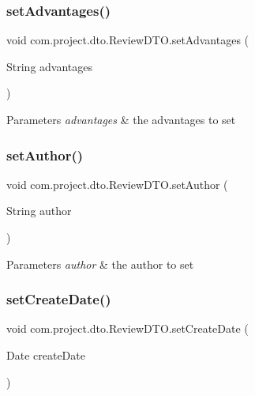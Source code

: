 \subsubsection{set\+Advantages()}
{\footnotesize\ttfamily void com.\+project.\+dto.\+Review\+D\+T\+O.\+set\+Advantages (\begin{DoxyParamCaption}\item[{String}]{advantages }\end{DoxyParamCaption})}


\begin{DoxyParams}{Parameters}
{\em advantages} & the advantages to set \\
\hline
\end{DoxyParams}
\mbox{\label{classcom_1_1project_1_1dto_1_1_review_d_t_o_ae32048e99304608f13d68900900032cd}} 
\subsubsection{set\+Author()}
{\footnotesize\ttfamily void com.\+project.\+dto.\+Review\+D\+T\+O.\+set\+Author (\begin{DoxyParamCaption}\item[{String}]{author }\end{DoxyParamCaption})}


\begin{DoxyParams}{Parameters}
{\em author} & the author to set \\
\hline
\end{DoxyParams}
\mbox{\label{classcom_1_1project_1_1dto_1_1_review_d_t_o_a207fc01c87c4b145693a9728023330be}} 
\subsubsection{set\+Create\+Date()}
{\footnotesize\ttfamily void com.\+project.\+dto.\+Review\+D\+T\+O.\+set\+Create\+Date (\begin{DoxyParamCaption}\item[{Date}]{create\+Date }\end{DoxyParamCaption})}


